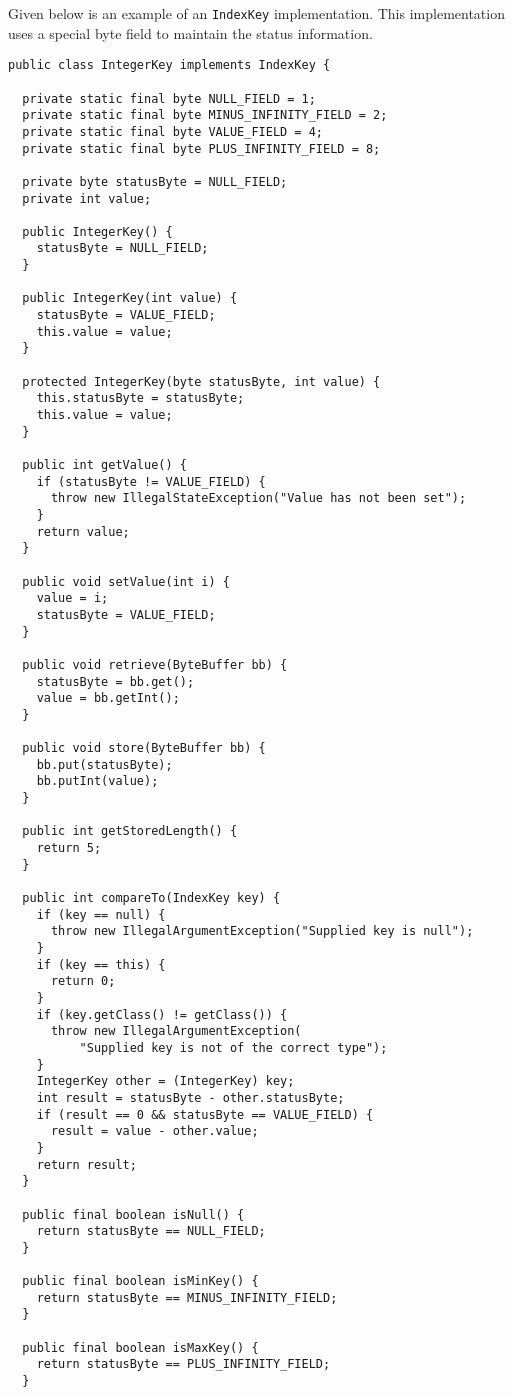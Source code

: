 \documentclass[a4paper,draft,oneside]{book}
\begin{document}
Given below is an example of an \verb|IndexKey| implementation. This
implementation uses a special byte field to maintain the status
information.

\begin{verbatim}
public class IntegerKey implements IndexKey {

  private static final byte NULL_FIELD = 1;
  private static final byte MINUS_INFINITY_FIELD = 2;
  private static final byte VALUE_FIELD = 4;
  private static final byte PLUS_INFINITY_FIELD = 8;

  private byte statusByte = NULL_FIELD;
  private int value;

  public IntegerKey() {
    statusByte = NULL_FIELD;
  }

  public IntegerKey(int value) {
    statusByte = VALUE_FIELD;
    this.value = value;
  }

  protected IntegerKey(byte statusByte, int value) {
    this.statusByte = statusByte;
    this.value = value;
  }

  public int getValue() {
    if (statusByte != VALUE_FIELD) {
      throw new IllegalStateException("Value has not been set");
    }
    return value;
  }

  public void setValue(int i) {
    value = i;
    statusByte = VALUE_FIELD;
  }

  public void retrieve(ByteBuffer bb) {
    statusByte = bb.get();
    value = bb.getInt();
  }

  public void store(ByteBuffer bb) {
    bb.put(statusByte);
    bb.putInt(value);
  }

  public int getStoredLength() {
    return 5;
  }

  public int compareTo(IndexKey key) {
    if (key == null) {
      throw new IllegalArgumentException("Supplied key is null");
    }
    if (key == this) {
      return 0;
    }
    if (key.getClass() != getClass()) {
      throw new IllegalArgumentException(
          "Supplied key is not of the correct type");
    }
    IntegerKey other = (IntegerKey) key;
    int result = statusByte - other.statusByte;
    if (result == 0 && statusByte == VALUE_FIELD) {
      result = value - other.value;
    }
    return result;
  }

  public final boolean isNull() {
    return statusByte == NULL_FIELD;
  }

  public final boolean isMinKey() {
    return statusByte == MINUS_INFINITY_FIELD;
  }

  public final boolean isMaxKey() {
    return statusByte == PLUS_INFINITY_FIELD;
  }


\end{verbatim}
\end{document}
